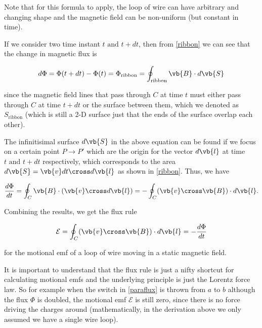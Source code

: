 \documentclass[english,a4paper,12pt]{report}
\begin{document}
Note that for this formula to apply, the loop of wire can have arbitrary and changing shape and the magnetic field can be non-uniform (but constant in time). 

If we consider two time instant \(t \text { and } t+dt\), then from \cref{ribbon} we can see that the change in magnetic flux is


\begin{equation}
    d\Phi = \Phi (t+dt) - \Phi (t) = \Phi _{\text{ribbon}} = \oint_{\text{ribbon} } \vb{B} \cdot d \vb{S} 
\end{equation}

since the magnetic field lines that pass through \(C\) at time \(t\) must either pass through \(C\) at time \(t+dt\) or the surface between them, which we denoted as \(S _{\text{ribbon} } \) (which is still a 2-D surface just that the ends of the surface overlap each other). 

The infinitisimal surface \(d \vb{S} \) in the above equation can be found if we focus on a certain point \(P \rightarrow P'\) which are the origin for the vector \(d \vb{l} \) at time \(t \text { and }  t+dt\) respectively, which corresponds to the area \(d\vb{S} = \vb{v} dt \cross d\vb{l} \) as shown in \cref{ribbon}. Thus, we have

\begin{equation}
    \frac{d\Phi }{dt} = \oint_{C} \vb{B} \cdot (\vb{v} \cross d \vb{l} ) = -\oint_{C} (\vb{v} \cross \vb{B} ) \cdot d \vb{l}.    
\end{equation}

Combining the results, we get the flux rule

\begin{equation} \label{motionalemf} 
    \mathcal{E} = \oint_{C} (\vb{v} \cross \vb{B} )\cdot d \vb{l} = -\frac{d\Phi }{dt}
\end{equation}

for the motional emf of a loop of wire moving in a static magnetic field.

It is important to understand that the flux rule is just a nifty shortcut for calculating motional emfs and the underlying principle is just the Lorentz force law. So for example when the switch in \cref{paraflux} is thrown from \(a\) to \(b\) although the flux \(\Phi \) is doubled, the motional emf \(\mathcal{E}\) is still zero, since there is no force driving the charges around (mathematically, in the derivation above we only assumed we have a single wire loop).
\end{document}
